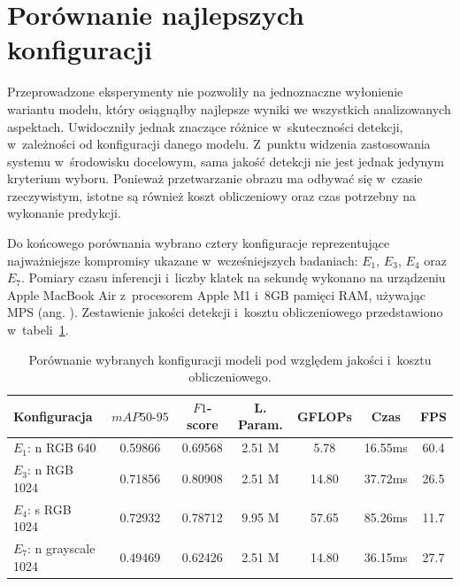 \section{Porównanie najlepszych konfiguracji}

Przeprowadzone eksperymenty nie pozwoliły na jednoznaczne wyłonienie wariantu modelu, który osiągnąłby najlepsze wyniki we wszystkich analizowanych aspektach. Uwidoczniły jednak znaczące różnice w~skuteczności detekcji, w~zależności od konfiguracji danego modelu. Z~punktu widzenia zastosowania systemu w~środowisku docelowym, sama jakość detekcji nie jest jednak jedynym kryterium wyboru. Ponieważ przetwarzanie obrazu ma odbywać się w~czasie rzeczywistym, istotne są również koszt obliczeniowy oraz czas potrzebny na wykonanie predykcji.

Do końcowego porównania wybrano cztery konfiguracje reprezentujące najważniejsze kompromisy ukazane w~wcześniejszych badaniach: $E_1$, $E_3$, $E_4$ oraz $E_7$. Pomiary czasu inferencji i~liczby klatek na sekundę wykonano na urządzeniu Apple MacBook Air z~procesorem Apple M1 i~8GB pamięci RAM, używając MPS (ang. ). Zestawienie jakości detekcji i~kosztu obliczeniowego przedstawiono w~tabeli~\ref{tab:best_models}.

\begin{table}[ht]
    \centering
    \caption{Porównanie wybranych konfiguracji modeli pod względem jakości i~kosztu obliczeniowego.}
    \label{tab:best_models}
    \begin{tabular}{l|cccccc}
        \toprule
        \textbf{Konfiguracja}
                                & \textbf{$mAP50\text{-}95$} & \textbf{$F1$-score} & \textbf{L. Param.} & \textbf{GFLOPs} & \textbf{Czas} & \textbf{FPS} \\
        \midrule
        $E_1$: n RGB 640        & 0.59866                    & 0.69568             & 2.51 M             & 5.78            & 16.55ms       & 60.4         \\

        $E_3$: n RGB 1024       & 0.71856                    & 0.80908             & 2.51 M             & 14.80           & 37.72ms       & 26.5         \\

        $E_4$: s RGB 1024       & 0.72932                    & 0.78712             & 9.95 M             & 57.65           & 85.26ms       & 11.7         \\

        $E_7$: n grayscale 1024 & 0.49469                    & 0.62426             & 2.51 M             & 14.80           & 36.15ms       & 27.7         \\
        \bottomrule
    \end{tabular}
\end{table}

